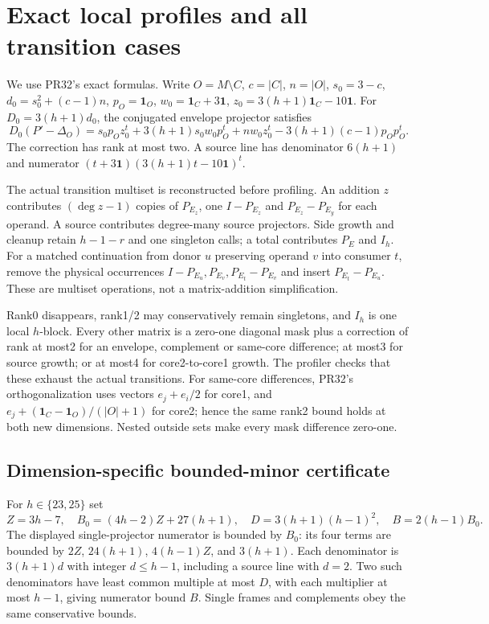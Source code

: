 \documentclass[11pt]{article}
\begin{document}
\section{Exact local profiles and all transition cases}
We use PR32's exact formulas. Write $O=M\setminus C$, $c=|C|$, $n=|O|$,
$s_0=3-c$, $d_0=s_0^2+(c-1)n$, $p_O=\mathbf1_O$,
$w_0=\mathbf1_C+3\mathbf1$, $z_0=3(h+1)\mathbf1_C-10\mathbf1$.
For $D_0=3(h+1)d_0$, the conjugated envelope projector satisfies
\[
 D_0(P'-\Delta_O)=s_0p_Oz_0^t+3(h+1)s_0w_0p_O^t
             +nw_0z_0^t-3(h+1)(c-1)p_Op_O^t.
\]
The correction has rank at most two. A source line has denominator
$6(h+1)$ and numerator $(t+3\mathbf1)(3(h+1)t-10\mathbf1)^t$.

The actual transition multiset is reconstructed before profiling. An addition
$z$ contributes $(\deg z-1)$ copies of $P_{E_z}$, one $I-P_{E_z}$ and
$P_{E_z}-P_{E_y}$ for each operand. A source contributes degree-many source
projectors. Side growth and cleanup retain $h-1-r$ and one singleton calls;
a total contributes $P_E$ and $I_h$. For a matched continuation from donor
$u$ preserving operand $v$ into consumer $t$, remove the physical occurrences
$I-P_{E_u},P_{E_v},P_{E_t}-P_{E_v}$ and insert $P_{E_t}-P_{E_u}$.
These are multiset operations, not a matrix-addition simplification.

Rank0 disappears, rank1/2 may conservatively remain singletons, and $I_h$
is one local $h$-block. Every other matrix is a zero-one diagonal mask plus
a correction of rank at most2 for an envelope, complement or same-core
difference; at most3 for source growth; or at most4 for core2-to-core1 growth.
The profiler checks that these exhaust the actual transitions. For same-core
differences, PR32's orthogonalization uses vectors $e_j+e_i/2$ for core1,
and $e_j+(\mathbf1_C-\mathbf1_O)/(|O|+1)$ for core2; hence the same rank2
bound holds at both new dimensions. Nested outside sets make every mask
difference zero-one.

\subsection{Dimension-specific bounded-minor certificate}
For $h\in\{23,25\}$ set
\[
 Z=3h-7,\quad B_0=(4h-2)Z+27(h+1),\quad
 D=3(h+1)(h-1)^2,\quad B=2(h-1)B_0.
\]
The displayed single-projector numerator is bounded by $B_0$: its four
terms are bounded by $2Z$, $24(h+1)$, $4(h-1)Z$, and $3(h+1)$.
Each denominator is $3(h+1)d$ with integer $d\le h-1$, including a source
line with $d=2$. Two such denominators have least common multiple at most
$D$, with each multiplier at most $h-1$, giving numerator bound $B$.
Single frames and complements obey the same conservative bounds.
\end{document}
